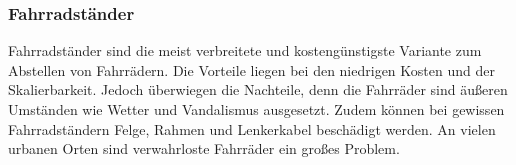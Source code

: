 \subsubsection{Fahrradständer}
Fahrradständer sind die meist verbreitete und kostengünstigste Variante zum Abstellen von Fahrrädern. Die Vorteile liegen bei den niedrigen Kosten und der Skalierbarkeit. Jedoch überwiegen die Nachteile, denn die Fahrräder sind äußeren Umständen wie Wetter und Vandalismus ausgesetzt. Zudem können bei gewissen Fahrradständern Felge, Rahmen und Lenkerkabel beschädigt werden. An vielen urbanen Orten sind verwahrloste Fahrräder ein großes Problem.